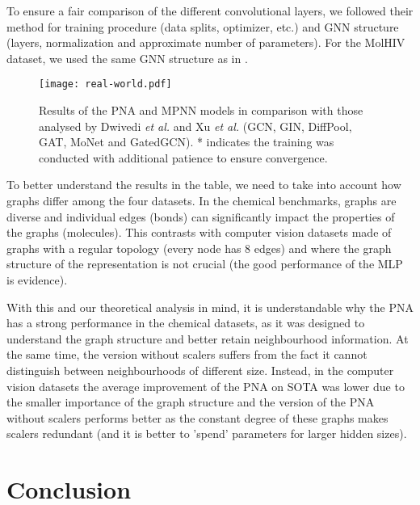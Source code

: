 \documentclass{article}
\begin{document}
To ensure a fair comparison of the different convolutional layers, we followed their method for training procedure (data splits, optimizer, etc.) and GNN structure (layers, normalization and approximate number of parameters). For the MolHIV dataset, we used the same GNN structure as in \cite{beaini2020directional}.



\begin{figure}[h]
\centering
\texttt{[image: real-world.pdf]}
\label{fig:real_world}
\caption{Results of the PNA and MPNN models in comparison with those analysed by Dwivedi \emph{et al.} and Xu \emph{et al.} (GCN\cite{kipf2016gcn},  GIN\cite{xu2018gin}, DiffPool\cite{ying2018hierarchical}, GAT\cite{velikovic2017gat}, MoNet\cite{monti2017moNet} and GatedGCN\cite{bresson2017gatedGCN}). * indicates the training was conducted with additional patience to ensure convergence.}
\end{figure} 

To better understand the results in the table, we need to take into account how graphs differ among the four datasets. In the chemical benchmarks, graphs are diverse and individual edges (bonds) can significantly impact the properties of the graphs (molecules). This contrasts with computer vision datasets made of graphs with a regular topology (every node has 8 edges) and where the graph structure of the representation is not crucial (the good performance of the MLP is evidence).

With this and our theoretical analysis in mind, it is understandable why the PNA has a strong performance in the chemical datasets, as it was designed to understand the graph structure and better retain neighbourhood information. At the same time, the version without scalers suffers from the fact it cannot distinguish between neighbourhoods of different size. Instead, in the computer vision datasets the average improvement of the PNA on SOTA was lower due to the smaller importance of the graph structure and the version of the PNA without scalers performs better as the constant degree of these graphs makes scalers redundant (and it is better to 'spend' parameters for larger hidden sizes).

\section{Conclusion}
\end{document}
